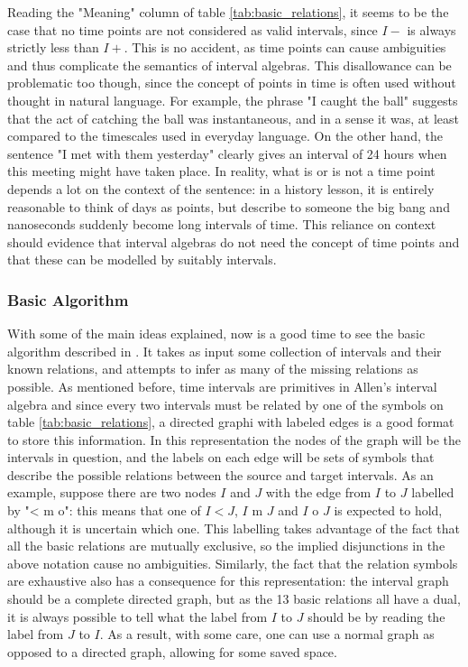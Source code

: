 \documentclass[../main.tex]{subfiles}
\begin{document}
Reading the "Meaning" column of table \ref{tab:basic_relations}, it seems to be the case that
no time points are not considered as valid intervals, since $I-$ is always strictly less than
$I+$. This is no accident, as time points can cause ambiguities and thus complicate the
semantics of interval algebras. This disallowance can be problematic too though, since the
concept of points in time is often used without thought in natural language. For example, the 
phrase "I caught the ball" suggests that the act of catching the ball was instantaneous, and in a
sense it was, at least compared to the timescales used in everyday language. On the other hand,
the sentence "I met with them yesterday" clearly gives an interval of 24 hours when this meeting
might have taken place. In reality, what is or is not a time point depends a lot on the
context of the sentence: in a history lesson, it is entirely reasonable to think of days as
points, but describe to someone the big bang and nanoseconds suddenly become long intervals of
time. This reliance on context should evidence that interval algebras do not need the concept
of time points and that these can be modelled by suitably intervals.

\subsubsection{Basic Algorithm}%
\label{ssub:basic_algorithm}

With some of the main ideas explained, now is a good time to see the basic algorithm described in
\cite{allen83}. It takes as input some collection of intervals and their known relations, and
attempts to infer as many of the missing relations as possible. As mentioned
before, time intervals are primitives in Allen's interval algebra and since every two intervals
must be related by one of the symbols on table \ref{tab:basic_relations}, a directed graphi with
labeled edges is a good format to store this information. In this representation the nodes of the
graph will be the intervals in question, and the labels on each edge will be sets of symbols that
describe the possible relations between the source and target intervals. As an example, suppose
there are two nodes $I$ and $J$ with the edge from $I$ to $J$ labelled by "< m o": this
means that one of $I < J$, $I\text{ m }J$ and $I\text{ o }J$ is expected to hold, although it is
uncertain which one. This labelling takes advantage of the fact that all the basic relations
are mutually exclusive, so the implied disjunctions in the above notation cause no ambiguities.
Similarly, the fact that the relation symbols are exhaustive also has a consequence for this
representation: the interval graph should be a complete directed graph, but as the 13 basic
relations all have a dual, it is always possible to tell what the label from $I$ to $J$ should be
by reading the label from $J$ to $I$. As a result, with some care, one can use a normal graph
as opposed to a directed graph, allowing for some saved space.
\end{document}
